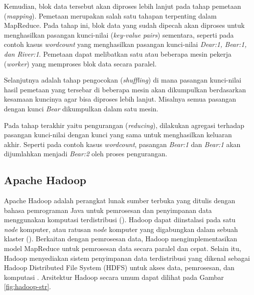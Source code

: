 Kemudian, blok data tersebut akan diproses lebih lanjut pada tahap pemetaan (\textit{mapping}). Pemetaan merupakan salah satu tahapan terpenting dalam MapReduce. Pada tahap ini, blok data yang sudah dipecah akan diproses untuk menghasilkan pasangan kunci-nilai (\textit{key-value pairs}) sementara, seperti pada contoh kasus \textit{wordcount} yang menghasilkan pasangan kunci-nilai \textit{Dear:1, Bear:1, dan River:1}. Pemetaan dapat melibatkan satu atau beberapa mesin pekerja (\textit{worker}) yang memproses blok data secara paralel.

Selanjutnya adalah tahap pengocokan (\textit{shuffling}) di mana pasangan kunci-nilai hasil pemetaan yang tersebar di beberapa mesin akan dikumpulkan berdasarkan kesamaan kuncinya agar bisa diproses lebih lanjut. Misalnya semua pasangan dengan kunci \textit{Bear} dikumpulkan dalam satu mesin.

Pada tahap terakhir yaitu pengurangan (\textit{reducing}), dilakukan agregasi terhadap pasangan kunci-nilai dengan kunci yang sama untuk menghasilkan keluaran akhir. Seperti pada contoh kasus \textit{wordcount}, pasangan \textit{Bear:1} dan \textit{Bear:1} akan dijumlahkan menjadi \textit{Bear:2} oleh proses pengurangan.

\subsection{Apache Hadoop}
Apache Hadoop adalah perangkat lunak sumber terbuka yang ditulis dengan bahasa pemrograman Java untuk pemrosesan dan penyimpanan data menggunakan komputasi terdistribusi (\cite{ApacheHadoop}). Hadoop dapat diinstalasi pada satu \textit{node} komputer, atau ratusan \textit{node} komputer yang digabungkan dalam sebuah klaster (\cite{maneasEvolutionHadoopDistributed2018}). Berkaitan dengan pemrosesan data, Hadoop mengimplementasikan model MapReduce untuk pemrosesan data secara paralel dan cepat. Selain itu, Hadoop menyediakan sistem penyimpanan data terdistribusi yang dikenal sebagai Hadoop Distributed File System (HDFS) untuk akses data, pemrosesan, dan komputasi \cite{dabasAnalysisCommentsYoutube2019}. Arsitektur Hadoop secara umum dapat dilihat pada Gambar \ref{fig:hadoop-str}.

